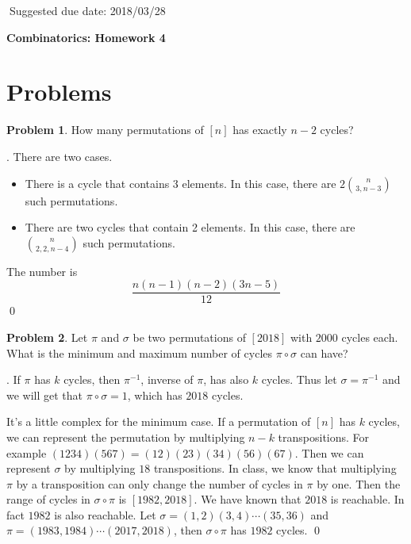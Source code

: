 \documentclass[12pt]{article}
\theoremstyle{definition}
\newtheorem{hw}{Problem}
\newenvironment{sol}
  {\par\vspace{3mm}\noindent{\it Solution}.}
  {\qed}
\begin{document}
$\;$\hfill Suggested due date: 2018/03/28

\bigskip

\begin{center}
{\LARGE\bf Combinatorics: Homework 4}
\end{center}

\bigskip

\section{Problems}

\begin{hw}
How many permutations of $[n]$ has exactly $n-2$ cycles?
\end{hw}

\begin{sol}
	There are two cases. 
	\begin{itemize}
		\item There is a cycle that contains 3 elements. In this case, there are $2\binom{n}{3,n-3}$ such permutations.
		\item There are two cycles that contain 2 elements. In this case, there are $\binom{n}{2,2,n-4}$ such permutations.
	\end{itemize}
	The number is 
	$$
		\frac{n(n-1)(n-2)(3n-5)}{12}
	$$
\end{sol}

\begin{hw}
Let $\pi$ and $\sigma$ be two permutations of $[2018]$ with $2000$ cycles each. What is the minimum and maximum number of cycles $\pi \circ \sigma$ can have?
\end{hw}

\begin{sol}
	If $\pi$ has $k$ cycles, then $\pi^{-1}$, inverse of $\pi$, has also $k$ cycles. Thus let $\sigma = \pi^{-1}$ and we will get that $\pi \circ \sigma = 1$, which has $2018$ cycles.
	
	It's a little complex for the minimum case. If a permutation of $[n]$ has $k$ cycles, we can represent the permutation by multiplying $n-k$ transpositions. For example $(1234)(567) = (12)(23)(34)(56)(67)$. Then we can represent $\sigma$ by multiplying $18$ transpositions. In class, we know that multiplying $\pi$ by a transposition can only change the number of cycles in $\pi$ by one. Then the range of cycles in $\sigma \circ \pi$ is $[1982,2018]$. We have known that $2018$ is reachable. In fact $1982$ is also reachable. Let $\sigma = (1,2)(3,4)\cdots (35,36)$ and $\pi = (1983,1984)\cdots (2017,2018)$, then $\sigma \circ \pi$ has $1982$ cycles.
\end{sol}
\end{document}
